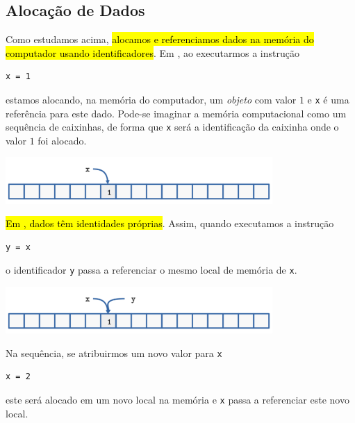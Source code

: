 \subsection{Alocação de Dados}

Como estudamos acima, \hl{alocamos e referenciamos dados na memória do computador usando identificadores}. Em {\python}, ao executarmos a instrução

\begin{lstlisting}
x = 1
\end{lstlisting}

estamos alocando, na memória do computador, um \emph{objeto} com valor $1$ e \texttt{x} é uma referência para este dado. Pode-se imaginar a memória computacional como um sequência de caixinhas, de forma que \texttt{x} será a identificação da caixinha onde o valor $1$ foi alocado.

\begin{center}
  \includegraphics[width=4in]{./cap_lingua/dados/fig_aloc_mem/xRecebe1.png}
\end{center}

\hl{Em {\python}, dados têm identidades próprias}. Assim, quando executamos a instrução

\begin{lstlisting}
y = x 
\end{lstlisting}

o identificador \texttt{y} passa a referenciar o mesmo local de memória de \texttt{x}.

\begin{center}
  \includegraphics[width=4in]{./cap_lingua/dados/fig_aloc_mem/yRecebex.png}
\end{center}

Na sequência, se atribuirmos um novo valor para \texttt{x}

\begin{lstlisting}
x = 2
\end{lstlisting}

este será alocado em um novo local na memória e \texttt{x} passa a referenciar este novo local.

